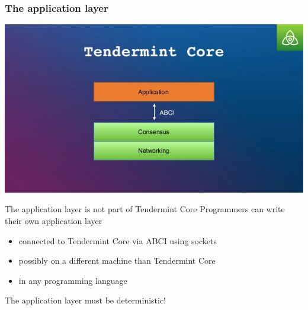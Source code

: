 \documentclass[11pt]{beamer}  %
\begin{document}
\begin{frame}\frametitle{The application layer}

  \begin{center}
    \includegraphics[scale=.15,clip=false]{pictures/tendermint-core.jpg}
  \end{center}
  
  \begin{greenbox}{The application layer is not part of Tendermint Core}
    Programmers can write their own application layer
    \begin{itemize}
    \item connected to Tendermint Core via ABCI using sockets
    \item possibly on a different machine than Tendermint Core
    \item in any programming language
    \end{itemize}
  \end{greenbox}

  \bigskip

  \begin{redbox}{}
    \begin{center}
      The application layer must be deterministic!
    \end{center}
  \end{redbox}

\end{frame}
\end{document}
